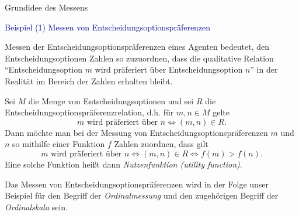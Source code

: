 \documentclass[
  8pt,
  ignorenonframetext,
]{beamer}
\begin{document}
\begin{frame}{Grundidee des Messens}
\protect\hypertarget{grundidee-des-messens-1}{}
\small

\textcolor{darkblue}{Beispiel (1) Messen von Entscheidungsoptionspräferenzen}

\footnotesize
\justifying

Messen der Entscheidungsoptionspräferenzen eines Agenten bedeutet, den
Entscheidungsoptionen Zahlen so zuzuordnen, dass die qualitative
Relation ``Entscheidungsoption \(m\) wird präferiert über
Entscheidungsoption \(n\)'' in der Realität im Bereich der Zahlen
erhalten bleibt.

Sei \(M\) die Menge von Entscheidungsoptionen und sei \(R\) die
Entscheidungsoptionspräferenzrelation, d.h. für \(m,n \in M\) gelte
\begin{equation}
m \mbox{ wird präferiert über } n \Leftrightarrow (m,n) \in R .
\end{equation} Dann möchte man bei der Messung von
Entscheidungsoptionspräferenzen \(m\) und \(n\) so mithilfe einer
Funktion \(f\) Zahlen zuordnen, dass gilt \begin{equation}
m \mbox{ wird präferiert über } n \Leftrightarrow (m,n) \in R \Leftrightarrow f(m) > f(n).
\end{equation} Eine solche Funktion heißt dann \emph{Nutzenfunktion
(utility function)}.

Das Messen von Entscheidungsoptionspräferenzen wird in der Folge unser
Beispiel für den Begriff der \emph{Ordinalmessung} und den zugehörigen
Begriff der \emph{Ordinalskala} sein.
\end{frame}
\end{document}
